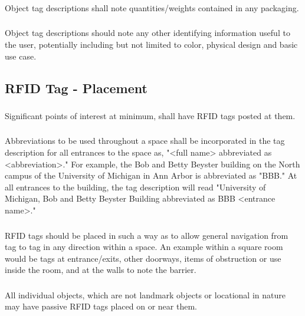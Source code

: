 \documentclass{article}
\begin{document}
\subsubsection{} Object tag descriptions shall note quantities/weights contained in any packaging.

\subsubsection{} Object tag descriptions should note any other identifying information useful to the user, potentially including but not limited to color, physical design and basic use case.

\subsection{RFID Tag - Placement}

\subsubsection{} Significant points of interest at minimum, shall have RFID tags posted at them.

\subsubsection{} Abbreviations to be used throughout a space shall be incorporated in the tag description for all entrances to the space as, "<full name> abbreviated as <abbreviation>." For example, the Bob and Betty Beyster building on the North campus of the University of Michigan in Ann Arbor is abbreviated as "BBB." At all entrances to the building, the tag description will read "University of Michigan, Bob and Betty Beyster Building abbreviated as BBB <entrance name>."

\subsubsection{} RFID tags should be placed in such a way as to allow general navigation from tag to tag in any direction within a space. An example within a square room would be tags at entrance/exits, other doorways, items of obstruction or use inside the room, and at the walls to note the barrier.

\subsubsection{} All individual objects, which are not landmark objects or locational in nature may have passive RFID tags placed on or near them.
\end{document}
